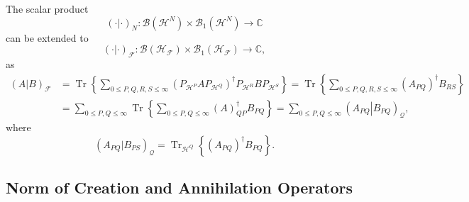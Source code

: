 \documentclass[aps,preprint]{revtex4}%
\begin{document}
The scalar product%
\begin{equation}
\left(  \cdot\left\vert \cdot\right.  \right)  _{N}:\mathcal{B}\left(
\mathcal{H}^{N}\right)  \times\mathcal{B}_{1}\left(  \mathcal{H}^{N}\right)
\rightarrow\mathbb{C}%
\end{equation}
can be extended to
\begin{equation}
\left(  \cdot\left\vert \cdot\right.  \right)  _{\mathcal{F}}:\mathcal{B}%
\left(  \mathcal{H}_{\mathcal{F}}\right)  \times\mathcal{B}_{1}\left(
\mathcal{H}_{\mathcal{F}}\right)  \rightarrow\mathbb{C},
\end{equation}
as
\begin{align}
\left(  A\left\vert B\right.  \right)  _{\mathcal{F}}  &  =\operatorname*{Tr}%
\left\{  \sum_{0\leq P,Q,R,S\leq\infty}\left(  P_{\mathcal{H}^{P}%
}AP_{\mathcal{H}^{Q}}\right)  ^{\dagger}P_{\mathcal{H}^{R}}BP_{\mathcal{H}%
^{S}}\right\}  =\operatorname*{Tr}\left\{  \sum_{0\leq P,Q,R,S\leq\infty
}\left(  A_{PQ}\right)  ^{\dagger}B_{RS}\right\} \nonumber\\
&  =\sum_{0\leq P,Q\leq\infty}\operatorname*{Tr}\left\{  \sum_{0\leq
P,Q\leq\infty}\left(  A\right)  _{QP}^{\dagger}B_{PQ}\right\}  =\sum_{0\leq
P,Q\leq\infty}\left(  A_{PQ}\left\vert B_{PQ}\right.  \right)  _{\mathcal{Q}},
\end{align}
where
\begin{equation}
\left(  A_{PQ}\left\vert B_{PS}\right.  \right)  _{\mathcal{Q}}%
=\operatorname*{Tr}\nolimits_{\mathcal{H}^{Q}}\left\{  \left(  A_{PQ}\right)
^{\dagger}B_{PQ}\right\}  .
\end{equation}


\subsection{Norm of Creation and Annihilation Operators}
\end{document}
